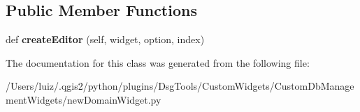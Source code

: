 \subsection*{Public Member Functions}
\begin{DoxyCompactItemize}
\item 
\mbox{\label{class_dsg_tools_1_1_custom_widgets_1_1_custom_db_management_widgets_1_1new_domain_widget_1_1_validated_item_delegate_a91b890f188c48ba0a24dc330fede840d}} 
def {\bfseries create\+Editor} (self, widget, option, index)
\end{DoxyCompactItemize}


The documentation for this class was generated from the following file\+:\begin{DoxyCompactItemize}
\item 
/\+Users/luiz/.\+qgis2/python/plugins/\+Dsg\+Tools/\+Custom\+Widgets/\+Custom\+Db\+Management\+Widgets/new\+Domain\+Widget.\+py\end{DoxyCompactItemize}
